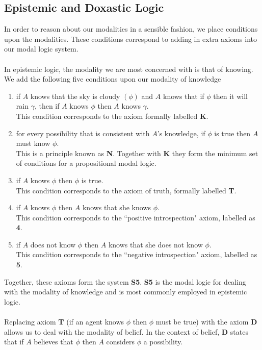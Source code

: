 \documentclass[12pt, a4paper, twoside]{article}
\begin{document}
\subsection{Epistemic and Doxastic Logic}\label{epistemic_logics}
In order to reason about our modalities in a sensible fashion, we place
conditions upon the modalities.
These conditions correspond to adding in extra axioms into our modal logic
system.\\
\\
In epistemic logic, the modality we are most concerned with is that of knowing.
We add the following five conditions upon our modality of knowledge
\begin{enumerate}
	\item if $A$ knows that the sky is cloudy $(\phi)$ and $A$ knows that if
	$\phi$ then it will rain $\gamma$, then if $A$ knows $\phi$ then $A$ knows
	$\gamma$.\\
	This condition corresponds to the axiom formally labelled {\bf K}.
	\item for every possibility that is consistent with $A$'s knowledge, if $\phi$
	is true then $A$ must know $\phi$.\\
	This is a principle known as {\bf N}.
	Together with {\bf K} they form the minimum set of conditions for a
	propositional modal logic.
	\item if $A$ knows $\phi$ then $\phi$ is true.\\
	This condition corresponds to the axiom of truth, formally labelled {\bf T}.
	\item if $A$ knows $\phi$ then $A$ knows that she knows $\phi$.\\
	This condition corresponds to the ``positive introspection" axiom, labelled 
	as {\bf 4}.
	\item if $A$ does not know $\phi$ then $A$ knows that she does not know
	$\phi$.\\
	This condition corresponds to the ``negative introspection" axiom, labelled 
	as {\bf 5}.
\end{enumerate}
Together, these axioms form the system {\bf S5}.
{\bf S5} is the modal logic for dealing with the modality of knowledge and is
most commonly employed in epistemic logic.\\
\\
Replacing axiom {\bf T} (if an agent knows $\phi$ then $\phi$ must be true) with
the axiom {\bf D} allows us to deal with the modality of belief.
In the context of belief, {\bf D} states that if $A$ believes that $\phi$ then
$A$ considers $\phi$ a possibility.
\end{document}

